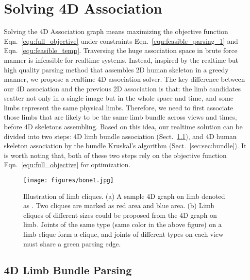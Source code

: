 \documentclass[10pt,twocolumn,letterpaper]{article}
\begin{document}
 \section{Solving 4D Association}
\label{sec:approx}

Solving the 4D Association graph means maximizing the objective function Eqn.~\ref{equ:full_objective} under constraints Eqn.~\ref{equ:feasible_parsing_1} and Eqn.~\ref{equ:feasible_temp}. Traversing the huge association space in brute force manner is infeasible for realtime systems. Instead, inspired by the realtime but high quality parsing method \cite{cao2018openpose} that assembles 2D human skeleton in a greedy manner, we propose a realtime 4D association solver. The key difference between our 4D association and the previous 2D association is that: the limb candidates scatter not only in a single image but in the whole space and time, and some limbs represent the same physical limbs. Therefore, we need to first associate those limbs that are likely to be the same limb bundle across views and times, before 4D skeletons assembling. Based on this idea, our realtime solution can be divided into two steps: 4D limb bundle association (Sect.~\ref{sec:sec:clique}), and 4D human skeleton association by the bundle Kruskal's algorithm (Sect.~\ref{sec:sec:bundle}). It is worth noting that, both of these two steps rely on the objective function Eqn.~\ref{equ:full_objective} for optimization.







\begin{figure}
  \centering
  \texttt{[image: figures/bone1.jpg]}
\caption{Illustration of limb cliques.
  (a) A sample 4D graph on limb  denoted as . Two cliques are marked as red area and blue area. (b) Limb cliques of different sizes could be proposed from the 4D graph on limb. Joints of the same type (same color in the above figure) on a limb clique form a clique, and joints of different types on each view must share a green parsing edge.
}
  \label{fig:bone_clique}
  \vspace{-3mm}
\end{figure}


\subsection{4D Limb Bundle Parsing}
\label{sec:sec:clique}
\end{document}
